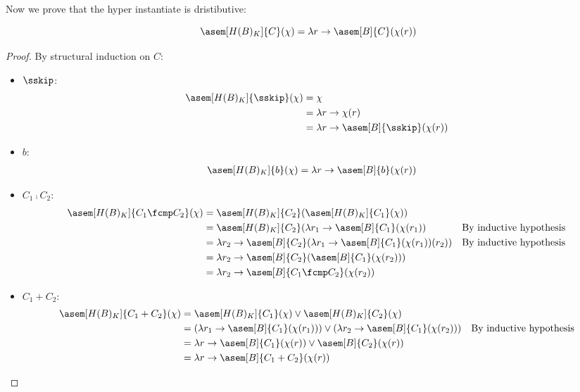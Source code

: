Now we prove that the hyper instantiate is dristibutive:
\begin{theorem}[Distributivity]
    \label{thm:hyper-add}
    $$\asem[H(B)_K]{C}(\mathcal{\chi}) = \lambda r \to \asem[B]{C}(\chi(r))$$
\end{theorem}
\begin{proof}
  By structural induction on $C$:
  \begin{itemize}
    \item $\sskip$:
      \begin{align*}
        \asem[H(B)_K]{\sskip}(\chi) 
          &= \chi \\
          &= \lambda r \to \chi(r) \\
          &= \lambda r \to \asem[B]{\sskip}(\chi(r))
      \end{align*}

    \item $b$:
      \begin{align*}
        \asem[H(B)_K]{b}(\chi) 
          &= \lambda r \to \asem[B]{b}(\chi(r))
      \end{align*}

    \item $C_1 \fcmp C_2$:
      \begin{align*}
        \asem[H(B)_K]{C_1 \fcmp C_2}(\chi) 
          &= \asem[H(B)_K]{C_2}(\asem[H(B)_K]{C_1}(\chi)) \\
          &= \asem[H(B)_K]{C_2}(\lambda r_1 \to 
            \asem[B]{C_1}(\chi(r_1))
          &\text{By inductive hypothesis} \\
          &= \lambda r_2 \to \asem[B]{C_2}(\lambda r_1 \to 
            \asem[B]{C_1}(\chi(r_1))(r_2))
          &\text{By inductive hypothesis} \\
          &= \lambda r_2 \to 
            \asem[B]{C_2}(\asem[B]{C_1}(\chi(r_2))) \\
          &= \lambda r_2 \to \asem[B]{C_1 \fcmp C_2}(\chi(r_2)) \\
      \end{align*}

    \item $C_1 + C_2$:
      \begin{align*}
        \asem[H(B)_K]{C_1 + C_2}(\chi)
          &= \asem[H(B)_K]{C_1}(\chi) 
            \lor \asem[H(B)_K]{C_2}(\chi) \\
          &= (\lambda r_1 \to \asem[B]{C_1}(\chi(r_1)))
            \lor (\lambda r_2 \to \asem[B]{C_1}(\chi(r_2)))
          &\text{By inductive hypothesis} \\
          &= \lambda r \to \asem[B]{C_1}(\chi(r))
            \lor \asem[B]{C_2}(\chi(r)) \\
          &= \lambda r \to \asem[B]{C_1 + C_2}(\chi(r))
      \end{align*}


\end{itemize}
\end{proof}
